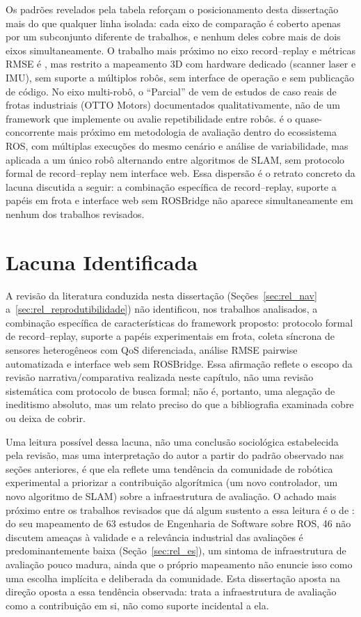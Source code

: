 Os padrões revelados pela tabela reforçam o posicionamento desta dissertação
mais do que qualquer linha isolada: cada eixo de comparação é coberto apenas
por um subconjunto diferente de trabalhos, e nenhum deles cobre mais de dois
eixos simultaneamente. O trabalho mais próximo no eixo record--replay e
métricas RMSE é , mas restrito a mapeamento 3D com
hardware dedicado (scanner laser e IMU), sem suporte a múltiplos robôs, sem
interface de operação e sem publicação de código. No eixo multi-robô, o
``Parcial'' de  vem de estudos de caso reais de
frotas industriais (OTTO Motors) documentados qualitativamente, não de um
framework que implemente ou avalie repetibilidade entre robôs. 
é o quase-concorrente mais próximo em metodologia de avaliação dentro do
ecossistema ROS, com múltiplas execuções do mesmo cenário e análise de
variabilidade, mas aplicada a um único robô alternando entre algoritmos de
SLAM, sem protocolo formal de record--replay nem interface web. Essa
dispersão é o retrato concreto da lacuna discutida a seguir: a combinação
específica de record--replay, suporte a papéis em frota e interface web sem
ROSBridge não aparece simultaneamente em nenhum dos trabalhos revisados.

\section{Lacuna Identificada}
\label{sec:rel_lacuna}

A revisão da literatura conduzida nesta dissertação (Seções~\ref{sec:rel_nav}
a~\ref{sec:rel_reprodutibilidade}) não identificou, nos trabalhos analisados, a
combinação específica de características do framework proposto: protocolo
formal de record--replay, suporte a papéis experimentais em frota, coleta
síncrona de sensores heterogêneos com QoS diferenciada, análise RMSE pairwise
automatizada e interface web sem ROSBridge. Essa afirmação reflete o escopo da
revisão narrativa/comparativa realizada neste capítulo, não uma revisão
sistemática com protocolo de busca formal; não é, portanto, uma alegação de
ineditismo absoluto, mas um relato preciso do que a bibliografia examinada
cobre ou deixa de cobrir.

Uma leitura possível dessa lacuna, não uma conclusão sociológica
estabelecida pela revisão, mas uma interpretação do autor a partir do padrão
observado nas seções anteriores, é que ela reflete uma tendência da
comunidade de robótica experimental a priorizar a contribuição algorítmica (um
novo controlador, um novo algoritmo de SLAM) sobre a infraestrutura de
avaliação. O achado mais próximo entre os trabalhos revisados que dá algum
sustento a essa leitura é o de : do seu mapeamento de
63 estudos de Engenharia de Software sobre ROS, 46 não discutem ameaças à
validade e a relevância industrial das avaliações é predominantemente baixa
(Seção~\ref{sec:rel_es}), um sintoma de infraestrutura de avaliação pouco
madura, ainda que o próprio mapeamento não enuncie isso como uma escolha
implícita e deliberada da comunidade. Esta dissertação aposta na direção
oposta a essa tendência observada: trata a infraestrutura de avaliação como a
contribuição em si, não como suporte incidental a ela.

